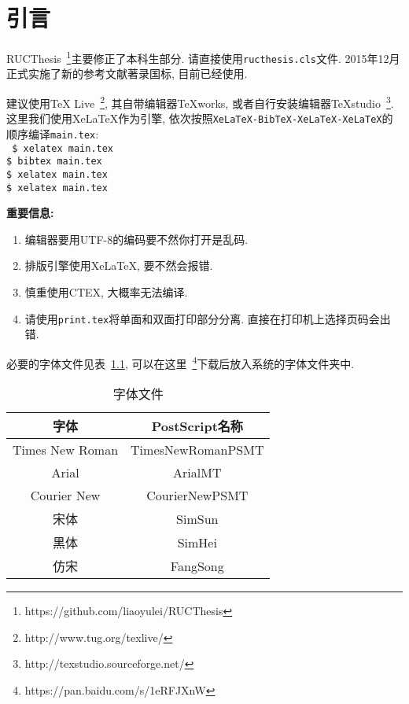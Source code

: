 \chapter{引言}
RUCThesis~\footnote{https://github.com/liaoyulei/RUCThesis}主要修正了本科生部分. 请直接使用{\tt ructhesis.cls}文件. 2015年12月正式实施了新的参考文献著录国标, 目前已经使用. 

建议使用TeX Live~\footnote{http://www.tug.org/texlive/}, 其自带编辑器TeXworks, 或者自行安装编辑器TeXstudio~\footnote{http://texstudio.sourceforge.net/}. 这里我们使用XeLaTeX作为引擎, 依次按照{\tt XeLaTeX-BibTeX-XeLaTeX-XeLaTeX}的顺序编译{\tt main.tex}:\\
{\tt
\$ xelatex main.tex\\
\$ bibtex main.tex\\
\$ xelatex main.tex\\
\$ xelatex main.tex\\}

\textbf{重要信息:}
\begin{enumerate}
\item 编辑器要用UTF-8的编码要不然你打开是乱码.
\item 排版引擎使用XeLaTeX, 要不然会报错.
\item 慎重使用CTEX, 大概率无法编译.
\item 请使用{\tt print.tex}将单面和双面打印部分分离. 直接在打印机上选择页码会出错.
\end{enumerate}

必要的字体文件见表~\ref{tab:postscript}, 可以在这里~\footnote{https://pan.baidu.com/s/1eRFJXnW}下载后放入系统的字体文件夹中.
\begin{table}[htbp]\centering\caption{字体文件}\label{tab:postscript}\begin{tabular}{c|c}
\hline
字体 & PostScript名称\\
\hline
Times New Roman & TimesNewRomanPSMT\\
Arial & ArialMT\\
Courier New & CourierNewPSMT\\
宋体 & SimSun\\
黑体 & SimHei\\
仿宋 & FangSong\\
\hline
\end{tabular}\end{table}
